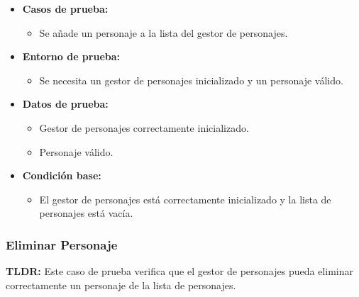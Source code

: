 \documentclass{article}
\begin{document}
\begin{itemize}
	\item \textbf{Casos de prueba:}
	\begin{itemize}
		\item Se añade un personaje a la lista del gestor de personajes.
	\end{itemize}
	
	\item \textbf{Entorno de prueba:}
	\begin{itemize}
		\item Se necesita un gestor de personajes inicializado y un personaje válido.
	\end{itemize}
	
	\item \textbf{Datos de prueba:}
	\begin{itemize}
		\item Gestor de personajes correctamente inicializado.
		\item Personaje válido.
	\end{itemize}
	
	\item \textbf{Condición base:}
	\begin{itemize}
		\item El gestor de personajes está correctamente inicializado y la lista de personajes está vacía.
	\end{itemize}
	
\end{itemize}

\subsubsection{Eliminar Personaje}
\textbf{TLDR:} Este caso de prueba verifica que el gestor de personajes pueda eliminar correctamente un personaje de la lista de personajes.
\end{document}
